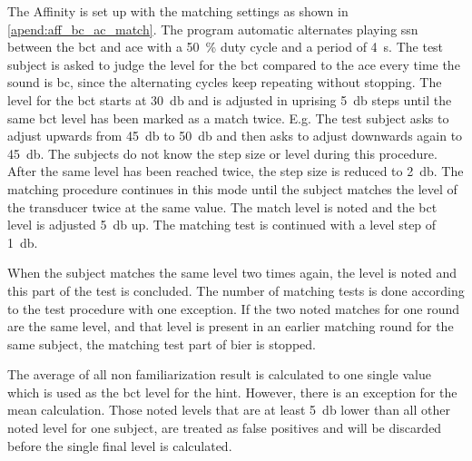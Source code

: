 The Affinity is set up with the matching settings as shown in \autoref{apend:aff_bc_ac_match}. The program automatic alternates playing \gls{ssn} between the \gls{bct} and \gls{ace} with a \SI{50}{\percent} duty cycle and a period of \SI{4}{\second}. The test subject is asked to judge the level for the \gls{bct} compared to the \gls{ace} every time the sound is \gls{bc}, since the alternating cycles keep repeating without stopping. The level for the \gls{bct} starts at \SI{30}{\decibel} and is adjusted in uprising \SI{5}{\decibel} steps until the same \gls{bct} level has been marked as a match twice. E.g. The test subject asks to adjust upwards from \SI{45}{\decibel} to \SI{50}{\decibel} and then asks to adjust downwards again to \SI{45}{\decibel}. The subjects do not know the step size or level during this procedure. 
After the same level has been reached twice, the step size is reduced to \SI{2}{\decibel}. The matching procedure continues in this mode until the subject matches the level of the transducer twice at the same value. The match level is noted and the  \gls{bct} level is adjusted \SI{5}{\decibel} up. The matching test is continued with a level step of \SI{1}{\decibel}.

When the subject matches the same level two times again, the level is noted and this part of the test is concluded. The number of matching tests is done according to the test procedure with one exception. If the two noted matches for one round are the same level, and that level is present in an earlier matching round for the same subject, the matching test part of \gls{bier} is stopped. 

The average of all non familiarization result is calculated to one single value which is used as the \gls{bct} level for the \gls{hint}. However, there is an exception for the mean calculation. Those noted levels that are at least \SI{5}{\decibel} lower than all other noted level for one subject, are treated as false positives and will be discarded before the single final level is calculated. 



